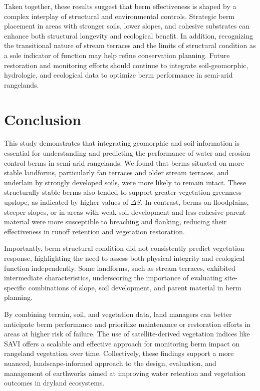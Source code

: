 \documentclass[review]{elsarticle}
\begin{document}
Taken together, these results suggest that berm effectiveness is shaped by a complex interplay of structural and environmental controls. Strategic berm placement in areas with stronger soils, lower slopes, and cohesive substrates can enhance both structural longevity and ecological benefit. In addition, recognizing the transitional nature of stream terraces and the limits of structural condition as a sole indicator of function may help refine conservation planning. Future restoration and monitoring efforts should continue to integrate soil-geomorphic, hydrologic, and ecological data to optimize berm performance in semi-arid rangelands.

\section{Conclusion}

This study demonstrates that integrating geomorphic and soil information is essential for understanding and predicting the performance of water and erosion control berms in semi-arid rangelands. We found that berms situated on more stable landforms, particularly fan terraces and older stream terraces, and underlain by strongly developed soils, were more likely to remain intact. These structurally stable berms also tended to support greater vegetation greenness upslope, as indicated by higher values of $\Delta S$. In contrast, berms on floodplains, steeper slopes, or in areas with weak soil development and less cohesive parent material were more susceptible to breaching and flanking, reducing their effectiveness in runoff retention and vegetation restoration.

Importantly, berm structural condition did not consistently predict vegetation response, highlighting the need to assess both physical integrity and ecological function independently. Some landforms, such as stream terraces, exhibited intermediate characteristics, underscoring the importance of evaluating site-specific combinations of slope, soil development, and parent material in berm planning.

By combining terrain, soil, and vegetation data, land managers can better anticipate berm performance and prioritize maintenance or restoration efforts in areas at higher risk of failure. The use of satellite-derived vegetation indices like SAVI offers a scalable and effective approach for monitoring berm impact on rangeland vegetation over time. Collectively, these findings support a more nuanced, landscape-informed approach to the design, evaluation, and management of earthworks aimed at improving water retention and vegetation outcomes in dryland ecosystems.
\end{document}
